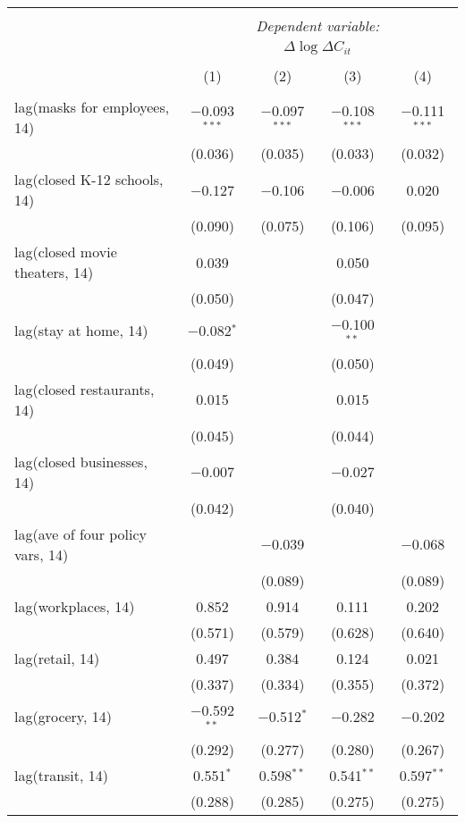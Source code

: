 \begin{tabular}{@{\extracolsep{1pt}}lcccc} 
\\[-1.8ex]\hline 
\hline \\[-1.8ex] 
 & \multicolumn{4}{c}{\textit{Dependent variable:}} \\ 
\cline{2-5} 
 & \multicolumn{4}{c}{$\Delta \log \Delta C_{it}$} \\ 
\\[-1.8ex] & (1) & (2) & (3) & (4)\\ 
\hline \\[-1.8ex] 
 lag(masks for employees, 14) & $-$0.093$^{***}$ & $-$0.097$^{***}$ & $-$0.108$^{***}$ & $-$0.111$^{***}$ \\ 
  & (0.036) & (0.035) & (0.033) & (0.032) \\ 
  lag(closed K-12 schools, 14) & $-$0.127 & $-$0.106 & $-$0.006 & 0.020 \\ 
  & (0.090) & (0.075) & (0.106) & (0.095) \\ 
  lag(closed movie theaters, 14) & 0.039 &  & 0.050 &  \\ 
  & (0.050) &  & (0.047) &  \\ 
  lag(stay at home, 14) & $-$0.082$^{*}$ &  & $-$0.100$^{**}$ &  \\ 
  & (0.049) &  & (0.050) &  \\ 
  lag(closed restaurants, 14) & 0.015 &  & 0.015 &  \\ 
  & (0.045) &  & (0.044) &  \\ 
  lag(closed businesses, 14) & $-$0.007 &  & $-$0.027 &  \\ 
  & (0.042) &  & (0.040) &  \\ 
  lag(ave of four policy vars, 14) &  & $-$0.039 &  & $-$0.068 \\ 
  &  & (0.089) &  & (0.089) \\ 
  lag(workplaces, 14) & 0.852 & 0.914 & 0.111 & 0.202 \\ 
  & (0.571) & (0.579) & (0.628) & (0.640) \\ 
  lag(retail, 14) & 0.497 & 0.384 & 0.124 & 0.021 \\ 
  & (0.337) & (0.334) & (0.355) & (0.372) \\ 
  lag(grocery, 14) & $-$0.592$^{**}$ & $-$0.512$^{*}$ & $-$0.282 & $-$0.202 \\ 
  & (0.292) & (0.277) & (0.280) & (0.267) \\ 
  lag(transit, 14) & 0.551$^{*}$ & 0.598$^{**}$ & 0.541$^{**}$ & 0.597$^{**}$ \\ 
  & (0.288) & (0.285) & (0.275) & (0.275) \\ 

\end{tabular}
